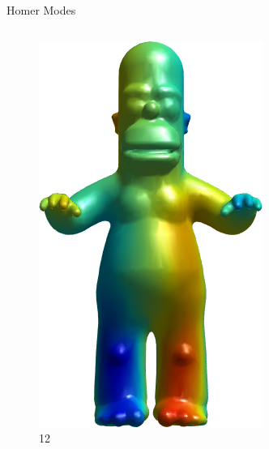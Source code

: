 \documentclass{beamer}
\begin{document}
\begin{frame}{Homer Modes}

\begin{columns}
\begin{column}[T]{3cm}
\begin{figure}[t]
    \includegraphics[width=\textwidth]{Harmonics/HomerModes/12.png}
    \caption*{\huge 12}
\end{figure}
\end{column}
\begin{column}[T]{3cm}
\begin{figure}[t]


\end{figure}
\end{column}
\end{columns}
\end{frame}
\end{document}
